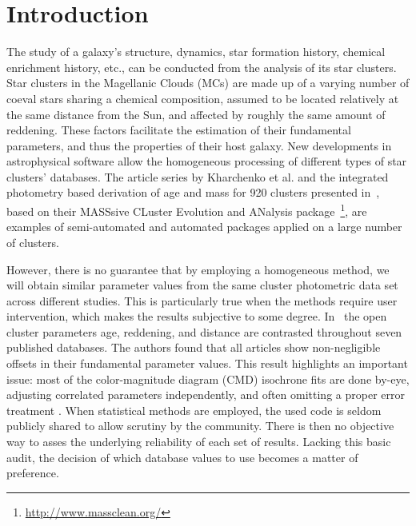 \documentclass[draft]{aa}
\begin{document}
\maketitle
%

\section{Introduction}
\label{sec:intro}

The study of a galaxy's structure, dynamics, star formation history, chemical
enrichment history, etc., can be conducted from the analysis of its star
clusters.
Star clusters in the Magellanic Clouds (MCs) are made up of a varying number of
coeval stars sharing a chemical composition, assumed to be located
relatively at the same distance from the Sun, and affected by roughly the same
amount of reddening. These factors facilitate the estimation of
their fundamental parameters, and thus the properties of their host galaxy.
%
New developments in astrophysical software allow the homogeneous
processing of different types of star clusters' databases. The article series
by Kharchenko et al. 
\citep[see][and references therein]{Kharchenko_2005,Schmeja_2014}
and the integrated photometry based derivation of age and mass for 920 clusters
presented
in~\cite{Popescu_2012}, based on their MASSsive CLuster Evolution and
ANalysis package~\citep[MASSCLEAN,][]{Popescu_2009}\footnote{
\url{http://www.massclean.org/}}, are examples of semi-automated and automated
packages applied on a large number of clusters.

However, there is no guarantee that by employing a homogeneous method, we will
obtain similar parameter values from the same cluster photometric
data set across different studies. This is particularly true when the methods
require user intervention, which makes the results subjective to some degree.
%
In~\cite{Netopil_2015} the open cluster parameters age, reddening, and distance
are contrasted throughout seven published databases. The authors found that all
articles show non-negligible offsets in their fundamental parameter values.
%
This result highlights an important issue: most of the color-magnitude diagram 
(CMD) isochrone fits are done by-eye, adjusting correlated parameters
independently, and often omitting a proper error treatment \citep[see]
[for a more detailed description of this problem]{vonHippel_2014}.
%
When statistical methods are employed, the used code is seldom publicly
shared to allow scrutiny by the community. There is then no objective way to
asses the underlying reliability of each set of results.
Lacking this basic audit, the decision of which database values to use
becomes a matter of preference.
\end{document}
